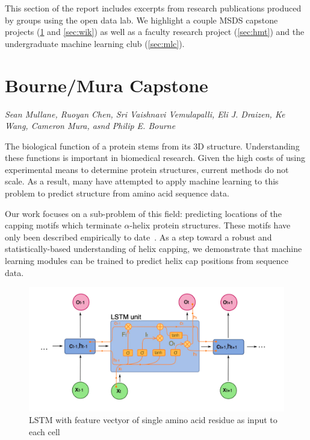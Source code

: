 This section of the report includes excerpts from research publications produced by groups using the open data lab. We highlight a couple MSDS capstone projects (\ref{sec:BMC} and \ref{sec:wik}) as well as a faculty research project (\ref{sec:hmt}) and the undergraduate machine learning club (\ref{sec:mlc}).

\section{Bourne/Mura Capstone}
\label{sec:BMC}

\emph{Sean Mullane, Ruoyan Chen, Sri Vaishnavi Vemulapalli, Eli J. Draizen, Ke Wang, Cameron Mura, asnd Philip E. Bourne}
\bigskip

The biological function of a protein stems from its 3D structure. Understanding these functions is important in biomedical research. Given the high costs of using experimental means to determine protein structures, current methods do not scale. As a result, many have attempted to apply machine learning to this problem to predict structure from amino acid sequence data.

Our work focuses on a sub-problem of this field: predicting locations of the capping motifs which terminate $\alpha$-helix protein structures. These motifs have only been described empirically to date~\cite{ref:bmc}. As a step toward a robust and statistically-based understanding of helix capping, we demonstrate that machine learning modules can be trained to predict helix cap positions from sequence data.

\begin{figure}[!hbtp]
\includegraphics[width=\textwidth]{images/bmc1}
\caption{LSTM with feature vectyor of single amino acid residue as input to each cell}
\end{figure}

